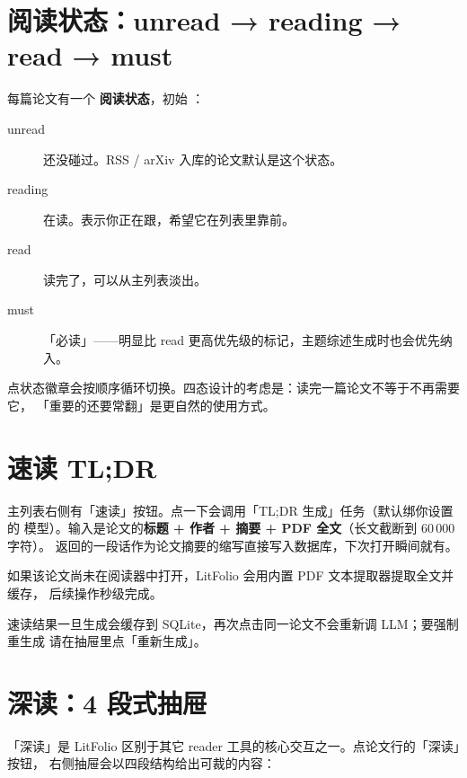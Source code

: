\section{阅读状态：unread → reading → read → must}

每篇论文有一个 \textbf{阅读状态}，初始 ：

\begin{description}
  \item[unread] 还没碰过。RSS / arXiv 入库的论文默认是这个状态。
  \item[reading] 在读。表示你正在跟，希望它在列表里靠前。
  \item[read] 读完了，可以从主列表淡出。
  \item[must] 「必读」——明显比 read 更高优先级的标记，主题综述生成时也会优先纳入。
\end{description}

点状态徽章会按顺序循环切换。四态设计的考虑是：读完一篇论文不等于不再需要它，
「重要的还要常翻」是更自然的使用方式。

\section{速读 TL;DR}

主列表右侧有「速读」按钮。点一下会调用「TL;DR 生成」任务（默认绑你设置的 
模型）。输入是论文的\textbf{标题 + 作者 + 摘要 + PDF 全文}（长文截断到 60\,000 字符）。
返回的一段话作为论文摘要的缩写直接写入数据库，下次打开瞬间就有。

如果该论文尚未在阅读器中打开，LitFolio 会用内置 PDF 文本提取器提取全文并缓存，
后续操作秒级完成。

\begin{tipbox}
速读结果一旦生成会缓存到 SQLite，再次点击同一论文不会重新调 LLM；要强制重生成
请在抽屉里点「重新生成」。
\end{tipbox}

\section{深读：4 段式抽屉}

「深读」是 LitFolio 区别于其它 reader 工具的核心交互之一。点论文行的「深读」按钮，
右侧抽屉会以四段结构给出可裁的内容：


